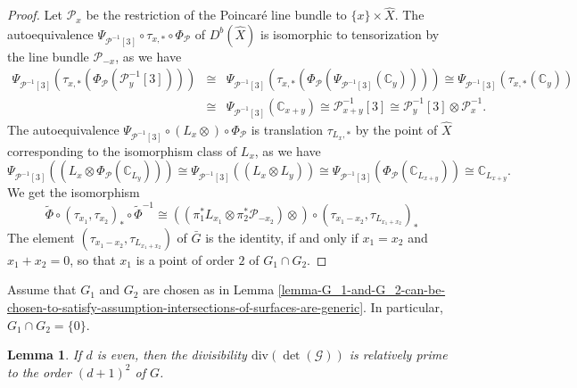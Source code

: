 \documentclass[12pt]{amsart}
\numberwithin{equation}{subsection}
\theoremstyle{plain}
\newtheorem{lem}[thm]{Lemma}
\theoremstyle{definition}
\newcommand{\CC}{{\mathbb C}}
\newcommand{\G}{{\mathcal G}}
\renewcommand{\P}{{\mathcal P}}
\begin{document}
\begin{proof}
Let $\P_x$ be the restriction of the Poincar\'{e} line bundle to $\{x\}\times \hat{X}$. 
The autoequivalence $\Psi_{\P^{-1}[3]}\circ \tau_{x,*}\circ\Phi_\P$ of $D^b(\hat{X})$ is isomorphic to tensorization by the line bundle $\P_{-x}$, as we have
\begin{eqnarray*}
\Psi_{\P^{-1}[3]}(\tau_{x,*}(\Phi_\P(\P^{-1}_y[3])))
&\cong&\Psi_{\P^{-1}[3]}(\tau_{x,*}(\Phi_\P(\Psi_{\P^{-1}[3]}(\CC_y))))
\cong\Psi_{\P^{-1}[3]}(\tau_{x,*}(\CC_y))
\\
&\cong&\Psi_{\P^{-1}[3]}(\CC_{x+y})\cong\P^{-1}_{x+y}[3]\cong
\P^{-1}_y[3]\otimes\P^{-1}_x.
\end{eqnarray*}
The autoequivalence $\Psi_{\P^{-1}[3]}\circ (L_x\otimes) \circ\Phi_\P$ is translation $\tau_{L_x,*}$ 
by the point of $\hat{X}$ corresponding to the isomorphism class of $L_x$, as we have
\[
\Psi_{\P^{-1}[3]}((L_x\otimes\Phi_\P(\CC_{L_y})))\cong \Psi_{\P^{-1}[3]}((L_x\otimes L_y))\cong
\Psi_{\P^{-1}[3]}(\Phi_\P(\CC_{L_{x+y}}))\cong \CC_{L_{x+y}}.
\] 
We get the isomorphism
\begin{equation}
\label{eq-elements-of-G}
\tilde{\Phi}\circ (\tau_{x_1},\tau_{x_2})_*\circ \tilde{\Phi}^{-1}\cong
((\pi_1^*L_{x_1}\otimes \pi_2^*\P_{-x_2})\otimes)\circ (\tau_{x_1-x_2},\tau_{L_{x_1+x_2}})_*
\end{equation}
The element  $(\tau_{x_1-x_2},\tau_{L_{x_1+x_2}})$ of $\bar{G}$ is the identity, if and only if $x_1=x_2$ and $x_1+x_2=0$,
so that $x_1$ is a point of order $2$ of $G_1\cap G_2$.
\end{proof} 

Assume that $G_1$ and $G_2$ are chosen as in Lemma \ref{lemma-G_1-and-G_2-can-be-chosen-to-satisfy-assumption-intersections-of-surfaces-are-generic}.
In particular, $G_1\cap G_2=\{0\}$. 

\begin{lem}
If $d$ is even, then 
the divisibility $\mbox{div}(\det(\G))$ is relatively prime to 
the order $(d+1)^2$ of $G$. 
\end{lem}
\end{document}
